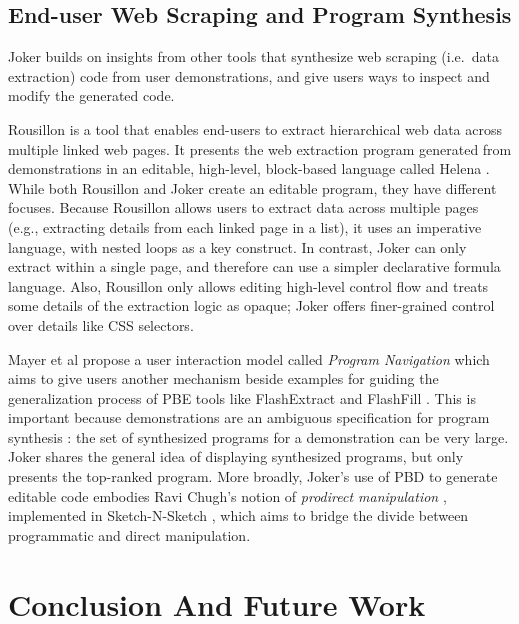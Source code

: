 \documentclass[sigconf,10pt]{acmart}
\begin{document}
\hypertarget{end-user-web-scraping-and-program-synthesis}{%
\subsection{End-user Web Scraping and Program
Synthesis}\label{end-user-web-scraping-and-program-synthesis}}

Joker builds on insights from other tools that synthesize web scraping
(i.e.~data extraction) code from user demonstrations, and give users
ways to inspect and modify the generated code.

Rousillon \citep{chasins2018} is a tool that enables end-users to
extract hierarchical web data across multiple linked web pages. It
presents the web extraction program generated from demonstrations in an
editable, high-level, block-based language called Helena \citep{2021c}.
While both Rousillon and Joker create an editable program, they have
different focuses. Because Rousillon allows users to extract data across
multiple pages (e.g., extracting details from each linked page in a
list), it uses an imperative language, with nested loops as a key
construct. In contrast, Joker can only extract within a single page, and
therefore can use a simpler declarative formula language. Also,
Rousillon only allows editing high-level control flow and treats some
details of the extraction logic as opaque; Joker offers finer-grained
control over details like CSS selectors.

Mayer et al propose a user interaction model called \emph{Program
Navigation} \citep{mayer2015} which aims to give users another mechanism
beside examples for guiding the generalization process of PBE tools like
FlashExtract \citep{le2014} and FlashFill \citep{harris}. This is
important because demonstrations are an ambiguous specification for
program synthesis \citep{peleg2018}: the set of synthesized programs for
a demonstration can be very large. Joker shares the general idea of
displaying synthesized programs, but only presents the top-ranked
program. More broadly, Joker's use of PBD to generate editable code
embodies Ravi Chugh's notion of \emph{prodirect manipulation}
\citep{chugh2016a}, implemented in Sketch-N-Sketch \citep{chugh2016},
which aims to bridge the divide between programmatic and direct
manipulation.

\hypertarget{sec:conclusion}{%
\section{Conclusion And Future Work}\label{sec:conclusion}}
\end{document}
